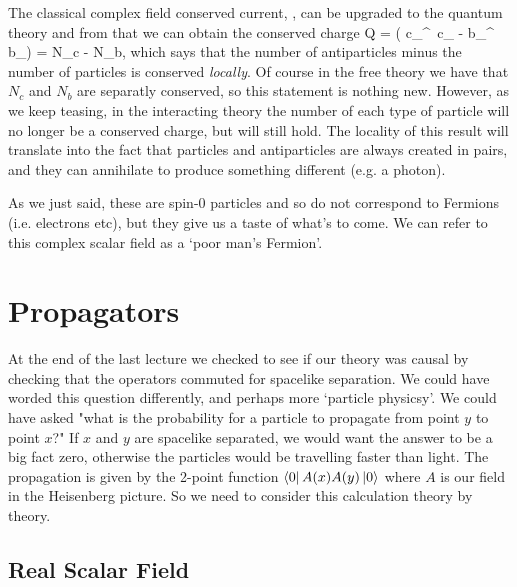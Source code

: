 The classical complex field conserved current, , can be upgraded to the quantum theory and from that we can obtain the conserved charge 
\be
\label{eqn:ParticleAntiparticleNumberConserved}
    Q = \int {} \big( c_{}^{\dagger}\,  c_{} - b_{}^{\dagger}\, b_{}\big) = N_c - N_b,
\ee 
which says that the number of antiparticles minus the number of particles is conserved \textit{locally}. Of course in the free theory we have that $N_c$ and $N_b$ are separatly conserved, so this statement is nothing new. However, as we keep teasing, in the interacting theory the number of each type of particle will no longer be a conserved charge, but  will still hold. The locality of this result will translate into the fact that particles and antiparticles are always created in pairs, and they can annihilate to produce something different (e.g. a photon). 

\br 
    As we just said, these are spin-0 particles and so do not correspond to Fermions (i.e. electrons etc), but they give us a taste of what's to come. We can refer to this complex scalar field as a `poor man's Fermion'.
\er

\section{Propagators}

At the end of the last lecture we checked to see if our theory was causal by checking that the operators commuted for spacelike separation. We could have worded this question differently, and perhaps more `particle physicsy'. We could have asked "what is the probability for a particle to propagate from point $y$ to point $x$?" If $x$ and $y$ are spacelike separated, we would want the answer to be a big fact zero, otherwise the particles would be travelling faster than light. The propagation is given by the 2-point function $\bra{0}A(x)A(y)\ket{0}$ where $A$ is our field in the Heisenberg picture. So we need to consider this calculation theory by theory. 

\subsection{Real Scalar Field}

